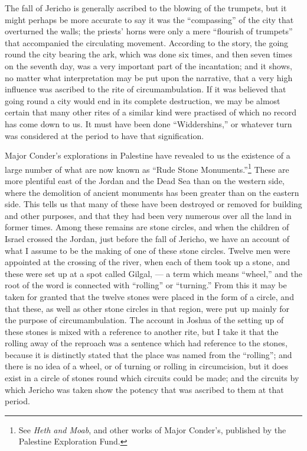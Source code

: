 \documentclass[a4paper, 11pt, oneside, polutonikogreek, english]{article}
\begin{document}
The fall of Jericho is generally ascribed to the blowing of the trumpets, but it might perhaps be more accurate to say it was the ``compassing'' of the city that overturned the walls; the priests' horns were only a mere ``flourish of trumpets'' that accompanied the circulating movement. According to the story, the going round the city bearing the ark, which was done six times, and then seven times on the seventh day, was a very important part of the incantation; and it shows, no matter what interpretation may be put upon the narrative, that a very high influence was ascribed to the rite of circumambulation. If it was believed that going round a city would end in its complete destruction, we may be almost certain that many other rites of a similar kind were practised of which no record has come down to us. It must have been done ``Widdershins,'' or whatever turn was considered at the period to have that signification.

Major Conder's explorations in Palestine have revealed to us the existence of a large number of what are now known as ``Rude Stone Monuments.''\footnote{See \emph{Heth and Moab}, and other works of Major Conder's, published by the Palestine Exploration Fund.} These are more plentiful east of the Jordan and the Dead Sea than on the western side, where the demolition of ancient monuments has been greater than on the eastern side. This tells us that many of these have been destroyed or removed for building and other purposes, and that they had been very numerous over all the land in former times. Among these remains are stone circles, and when the children of Israel crossed the Jordan, just before the fall of Jericho, we have an account of what I assume to be the making of one of these stone circles. Twelve men were appointed at the crossing of the river, when each of them took up a stone, and these were set up at a spot called Gilgal, --- a term which means ``wheel,'' and the root of the word is connected with ``rolling'' or ``turning.'' From this it may be taken for granted that the twelve stones were placed in the form of a circle, and that these, as well as other stone circles in that region, were put up mainly for the purpose of circumambulation. The account in Joshua of the setting up of these stones is mixed with a reference to another rite, but I take it that the rolling away of the reproach was a sentence which had reference to the stones, because it is distinctly stated that the place was named from the ``rolling''; and there is no idea of a wheel, or of turning or rolling in circumcision, but it does exist in a circle of stones round which circuits could be made; and the circuits by which Jericho was taken show the potency that was ascribed to them at that period.
\end{document}
